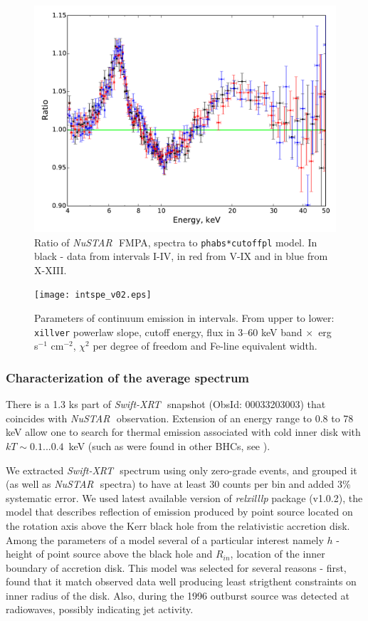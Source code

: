 \documentclass[a4paper,fleqn,usenatbib]{mnras}
\def\swiftx{{\em Swift-XRT\,}}
\def\nustar{{\em NuSTAR\,}}
\begin{document}
 \begin{figure}
\centerline{\includegraphics[width=\linewidth]{ratios_v01.pdf}}
\caption{Ratio of \nustar\, FMPA, spectra to \texttt{phabs*cutoffpl} model. In black - data from intervals I-IV, in red from V-IX and in blue from X-XIII.} 
\label{fig:ratios}
\end{figure}  

\begin{figure}
\centerline{\texttt{[image: intspe\_v02.eps]}}
\caption{Parameters of continuum emission in intervals. From upper to lower: \texttt{xillver} powerlaw slope, cutoff energy,  flux in 3--60 keV band $\times$\, erg s$^{-1}$ cm$^{-2}$, $\chi^{2}$ per degree of freedom and Fe-line equivalent width.} 
\label{fig:intspe}
\end{figure}  
            
\subsubsection{Characterization of the average spectrum}            
There is a 1.3 ks part of \swiftx\, snapshot (ObsId: 00033203003) that coincides with \nustar\, observation. Extension of an energy range to 0.8 to 78 keV allow one to search for thermal emission associated with cold inner disk with $kT \sim 0.1...0.4$~keV (such as were found in other BHCs, see \cite[][ e.t.c]{miller06b,miller06a,parker15}).

We extracted \swiftx\, spectrum using only zero-grade events, and grouped it (as well as \nustar\, spectra) to have at least 30 counts per bin and added 3\% systematic error. We used latest available version of {\it relxilllp} package (v1.0.2), the model that describes reflection of emission produced by point source located on the rotation axis above the Kerr black hole from the relativistic accretion disk. Among the parameters of a model several of a particular interest namely $h$ - height of point source above the black hole and $R_{in}$, location of the inner boundary of accretion disk.  This model was selected for several reasons - first, \cite{miller15_nust} found that it match observed data well producing least strigthent constraints on inner radius of the disk. Also, during the 1996 outburst source was detected at radiowaves, possibly indicating jet activity.
\end{document}
